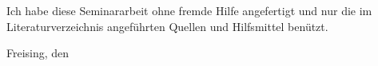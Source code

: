 Ich habe diese Seminararbeit ohne fremde Hilfe angefertigt und nur die im Literaturverzeichnis angeführten Quellen und Hilfsmittel benützt.

Freising, den \date{\today}